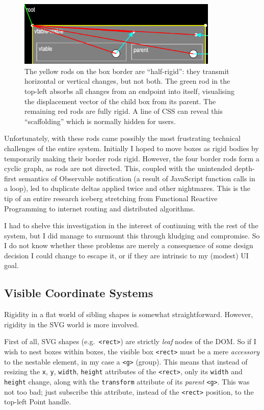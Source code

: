 \begin{figure}
  \centering
  \includegraphics[width=0.85\textwidth]{rods.png}
  \caption{The yellow rods on the box border are ``half-rigid'': they transmit horizontal or vertical changes, but not both. The green rod in the top-left absorbs all changes from an endpoint into itself, visualising the displacement vector of the child box from its parent. The remaining red rods are fully rigid. A line of CSS can reveal this ``scaffolding'' which is normally hidden for users. \label{fig:rods}}
\end{figure}

Unfortunately, with these rods came possibly the most frustrating
technical challenges of the entire system. Initially I hoped to move
boxes as rigid bodies by temporarily making their border rods rigid.
However, the four border rods form a cyclic graph, as rods are not
directed. This, coupled with the unintended depth-first semantics of
Observable notification (a result of JavaScript function calls in a
loop), led to duplicate deltas applied twice and other nightmares. This
is the tip of an entire research iceberg stretching from Functional
Reactive Programming to internet routing and distributed algorithms.

I had to shelve this investigation in the interest of continuing with
the rest of the system, but I did manage to surmount this through
kludging and compromise. So I do not know whether these problems are
merely a consequence of some design decision I could change to escape
it, or if they are intrinsic to my (modest) UI goal.

\hypertarget{visible-coordinate-systems}{%
\subsection{Visible Coordinate
Systems}\label{visible-coordinate-systems}}

Rigidity in a flat world of sibling shapes is somewhat straightforward.
However, rigidity in the SVG world is more involved.

First of all, SVG shapes (e.g.~\texttt{\textless{}rect\textgreater{}})
are strictly \emph{leaf} nodes of the DOM. So if I wish to nest boxes
within boxes, the visible box \texttt{\textless{}rect\textgreater{}}
must be a mere \emph{accessory} to the nestable element, in my case a
\texttt{\textless{}g\textgreater{}} (group). This means that instead of
resizing the \texttt{x}, \texttt{y}, \texttt{width}, \texttt{height}
attributes of the \texttt{\textless{}rect\textgreater{}}, only its
\texttt{width} and \texttt{height} change, along with the
\texttt{transform} attribute of its \emph{parent}
\texttt{\textless{}g\textgreater{}}. This was not too bad; just
subscribe this attribute, instead of the
\texttt{\textless{}rect\textgreater{}} position, to the top-left Point
handle.

